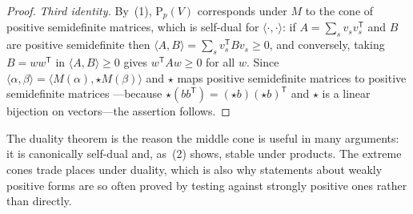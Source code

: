 \begin{proof}
\emph{Third identity.}  By
\,(1), $\mathrm{P}_p(V)$ corresponds
under $M$ to the cone of positive semidefinite matrices, which is self-dual
for $\langle\cdot,\cdot\rangle$: if $A=\sum_sv_sv_s^{\mathsf T}$ and $B$ are
positive semidefinite then
$\langle A,B\rangle=\sum_sv_s^{\mathsf T}Bv_s\geq0$, and conversely, taking
$B=ww^{\mathsf T}$ in $\langle A,B\rangle\geq0$ gives
$w^{\mathsf T}Aw\geq0$ for all $w$.  Since
$\langle\alpha,\beta\rangle=\langle M(\alpha),\star M(\beta)\rangle$ and
$\star$ maps positive semidefinite matrices to positive semidefinite matrices
---because $\star(bb^{\mathsf T})=(\star b)(\star b)^{\mathsf T}$ and $\star$
is a linear bijection on vectors---the assertion follows.
\end{proof}

The duality theorem is the reason the middle cone is useful in many
arguments: it is canonically self-dual and, as
\,(2) shows, stable under products.  The
extreme cones trade places under duality, which is also why statements
about weakly positive forms are so often proved by testing against strongly
positive ones rather than directly.

